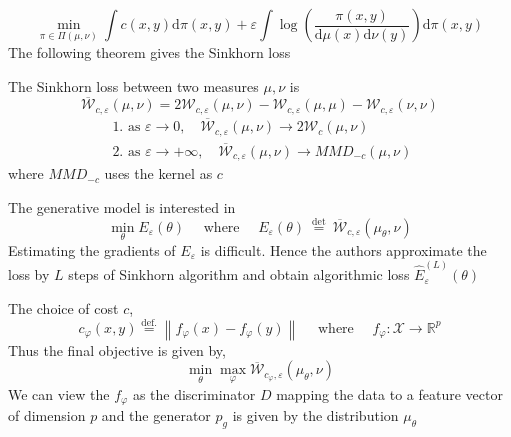 \begin{equation}
\min _{\pi \in \Pi(\mu, \nu)} \int c(x, y) \mathrm{d} \pi(x, y)+\varepsilon \int \log \left(\frac{\pi(x, y)}{\mathrm{d} \mu(x) \mathrm{d} \nu(y)}\right) \mathrm{d} \pi(x, y)
\end{equation}
The following theorem gives the Sinkhorn loss
\begin{theorem}
The Sinkhorn loss between two measures $\mu, \nu$ is 
$$
\overline{\mathcal{W}}_{c, \varepsilon}(\mu, \nu)=2 \mathcal{W}_{c, \varepsilon}(\mu, \nu)-\mathcal{W}_{c, \varepsilon}(\mu, \mu)-\mathcal{W}_{c, \varepsilon}(\nu, \nu)
$$
$$
\begin{array}{l}{\text { 1. as } \varepsilon \rightarrow 0, \quad \overline{\mathcal{W}}_{c, \varepsilon}(\mu, \nu) \rightarrow 2 \mathcal{W}_{c}(\mu, \nu)} \\ {\text { 2. } \text {as } \varepsilon \rightarrow+\infty, \quad \overline{\mathcal{W}}_{c, \varepsilon}(\mu, \nu) \rightarrow M M D_{-c}(\mu, \nu)}\end{array}
$$
where $MMD_{-c}$ uses the kernel as $c$
\end{theorem}{}
The generative model is interested in $$
\min _{\theta} E_{\varepsilon}(\theta) \quad \text { where } \quad E_{\varepsilon}(\theta) \stackrel{\text { det }}{=} \overline{\mathcal{W}}_{c, \varepsilon}\left(\mu_{\theta}, \nu\right)
$$
Estimating the gradients of $E_{\varepsilon}$ is difficult. Hence the authors approximate the loss by $L$ steps of Sinkhorn algorithm and obtain algorithmic loss $\hat{E}_{\varepsilon}^{(L)}(\theta)$

The choice of cost $c$,
$$
c_{\varphi}(x, y) \stackrel{\mathrm{def} .}{=}\left\|f_{\varphi}(x)-f_{\varphi}(y)\right\| \quad \text { where } \quad f_{\varphi} : \mathcal{X} \rightarrow \mathbb{R}^{p}
$$
Thus the final objective is given by,
$$
\min _{\theta} \max _{\varphi} \overline{\mathcal{W}}_{c_{\varphi}, \varepsilon} \left(\mu_{\theta}, \nu\right)
$$
We can view the $f_{\varphi}$ as the discriminator $D$ mapping the data to a feature vector of dimension $p$ and the generator $p_g$ is given by the distribution $\mu_{\theta}$

